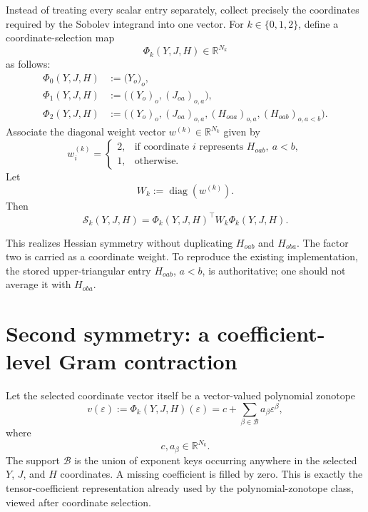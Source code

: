 \documentclass[11pt]{article}
\newcommand{\R}{\mathbb{R}}
\newcommand{\eps}{\varepsilon}
\newcommand{\diag}{\operatorname{diag}}
\begin{document}
Instead of treating every scalar entry separately, collect precisely the
coordinates required by the Sobolev integrand into one vector.
For \(k\in\{0,1,2\}\), define a coordinate-selection map
\[
    \Phi_k(Y,J,H)\in\R^{N_k}
\]
as follows:
\begin{align*}
    \Phi_0(Y,J,H)
    &:=
    \bigl(Y_o\bigr)_{o},\\
    \Phi_1(Y,J,H)
    &:=
    \bigl((Y_o)_o,(J_{oa})_{o,a}\bigr),\\
    \Phi_2(Y,J,H)
    &:=
    \bigl((Y_o)_o,(J_{oa})_{o,a},
           (H_{oaa})_{o,a},(H_{oab})_{o,a<b}\bigr).
\end{align*}
Associate the diagonal weight vector \(w^{(k)}\in\R^{N_k}\) given by
\[
    w_i^{(k)}
    =
    \begin{cases}
        2,&\text{if coordinate }i\text{ represents }H_{oab},\ a<b,\\
        1,&\text{otherwise}.
    \end{cases}
\]
Let
\[
    W_k:=\diag(w^{(k)}).
\]
Then
\begin{equation}
    \mathcal{S}_k(Y,J,H)
    =
    \Phi_k(Y,J,H)^\top W_k\Phi_k(Y,J,H).
    \label{eq:weighted-coordinate-form}
\end{equation}

This realizes Hessian symmetry without duplicating \(H_{oab}\) and \(H_{oba}\).
The factor two is carried as a coordinate weight.  To reproduce the existing
implementation, the stored upper-triangular entry \(H_{oab}\), \(a<b\), is
authoritative; one should not average it with \(H_{oba}\).

\section{Second symmetry: a coefficient-level Gram contraction}
\label{sec:gram}

Let the selected coordinate vector itself be a vector-valued polynomial
zonotope
\begin{equation}
    v(\eps)
    :=
    \Phi_k(Y,J,H)(\eps)
    =
    c+\sum_{\beta\in\mathcal{B}}a_\beta\eps^\beta,
    \label{eq:vector-pz}
\end{equation}
where
\[
    c,a_\beta\in\R^{N_k}.
\]
The support \(\mathcal{B}\) is the union of exponent keys occurring anywhere
in the selected \(Y\), \(J\), and \(H\) coordinates.  A missing coefficient is
filled by zero.  This is exactly the tensor-coefficient representation already
used by the polynomial-zonotope class, viewed after coordinate selection.
\end{document}

